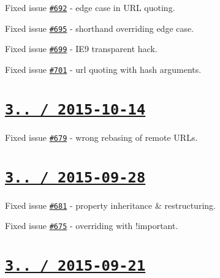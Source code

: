 \begin{DoxyItemize}
\item Fixed issue \href{https://github.com/jakubpawlowicz/clean-css/issues/692}{\tt \#692} -\/ edge case in U\+RL quoting.
\item Fixed issue \href{https://github.com/jakubpawlowicz/clean-css/issues/695}{\tt \#695} -\/ shorthand overriding edge case.
\item Fixed issue \href{https://github.com/jakubpawlowicz/clean-css/issues/699}{\tt \#699} -\/ I\+E9 transparent hack.
\item Fixed issue \href{https://github.com/jakubpawlowicz/clean-css/issues/701}{\tt \#701} -\/ {\ttfamily url} quoting with hash arguments.
\end{DoxyItemize}

\section*{\href{https://github.com/jakubpawlowicz/clean-css/compare/v3.4.5...v3.4.6}{\tt 3.. / 2015-\/10-\/14} }


\begin{DoxyItemize}
\item Fixed issue \href{https://github.com/jakubpawlowicz/clean-css/issues/679}{\tt \#679} -\/ wrong rebasing of remote U\+R\+Ls.
\end{DoxyItemize}

\section*{\href{https://github.com/jakubpawlowicz/clean-css/compare/v3.4.4...v3.4.5}{\tt 3.. / 2015-\/09-\/28} }


\begin{DoxyItemize}
\item Fixed issue \href{https://github.com/jakubpawlowicz/clean-css/issues/681}{\tt \#681} -\/ property inheritance \& restructuring.
\item Fixed issue \href{https://github.com/jakubpawlowicz/clean-css/issues/675}{\tt \#675} -\/ overriding with {\ttfamily !important}.
\end{DoxyItemize}

\section*{\href{https://github.com/jakubpawlowicz/clean-css/compare/v3.4.3...v3.4.4}{\tt 3.. / 2015-\/09-\/21} }


